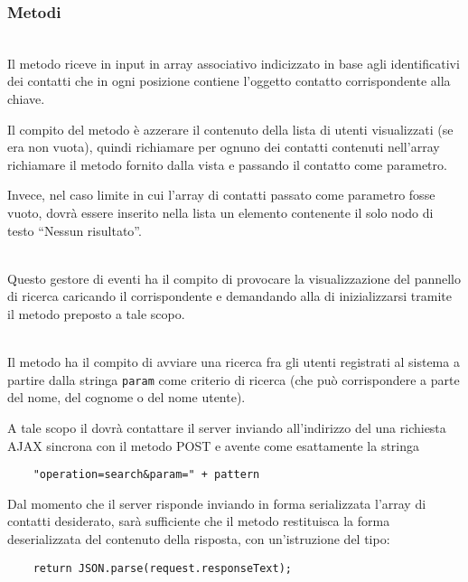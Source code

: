 \subsubsection*{Metodi}
\begin{description}
  
    \item{}\\
  Il metodo riceve in input in array associativo indicizzato in base agli identificativi dei contatti che in ogni posizione contiene l'oggetto contatto corrispondente alla chiave.
  
  Il compito del metodo è azzerare il contenuto della lista di utenti visualizzati (se era non vuota), quindi richiamare per ognuno dei contatti contenuti nell'array richiamare il metodo  fornito dalla vista e passando il contatto come parametro.
  
  Invece, nel caso limite in cui l'array di contatti passato come parametro fosse vuoto, dovrà essere inserito nella lista un elemento contenente il solo nodo di testo ``Nessun risultato''.
  
  \item{}\\
  Questo gestore di eventi ha il compito di provocare la visualizzazione del pannello di ricerca caricando il  corrispondente e demandando alla  di inizializzarsi tramite il metodo  preposto a tale scopo.
  
  \item{}\\
  Il metodo ha il compito di avviare una ricerca fra gli utenti registrati al sistema a partire dalla stringa \verb'param' come criterio di ricerca (che può corrispondere a parte del nome, del cognome o del nome utente).
  
  A tale scopo il  dovrà contattare il server inviando all'indirizzo del una richiesta AJAX sincrona con il metodo POST e avente come  esattamente la stringa
  \begin{verbatim}
    "operation=search&param=" + pattern
  \end{verbatim}
  
  Dal momento che il server risponde inviando in forma serializzata l'array di contatti desiderato, sarà sufficiente che il metodo restituisca la forma deserializzata del contenuto della risposta, con un'istruzione del tipo:
  \begin{verbatim}
    return JSON.parse(request.responseText);
  \end{verbatim}
  
\end{description}


